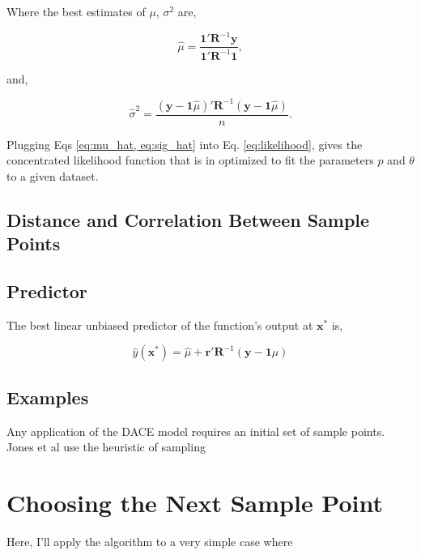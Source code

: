 \documentclass[letterpaper]{article}
\newcommand{\mb}{\mathbf}
\begin{document}
Where the best estimates of $\mu$, $\sigma^2$ are,

\begin{equation} \label{eq:mu_hat}
\hat{\mu}=\frac
	{\mb{1}'\mb{R}^{-1}\mb{y}}
	{\mb{1}'\mb{R}^{-1}\mb{1}},
\end{equation}


and,

\begin{equation} \label{eq:sig_hat}
\hat{\sigma}^2=\frac
	{(\mb{y}-\mb{1}\hat{\mu})'\mb{R}^{-1}(\mb{y}-\mb{1}\hat{\mu})}
	{n}.
\end{equation}

Plugging Eqs \ref{eq:mu_hat, eq:sig_hat} into Eq. \ref{eq:likelihood}, gives the concentrated likelihood function that is in optimized to fit the parameters $p$ and $\theta$ to a given dataset.

\subsection{Distance and Correlation Between Sample Points}




\subsection{Predictor}\label{sec:blup}The best linear unbiased predictor of the function's output at $\mb{x^*}$ is,


\begin{equation} \label{eq:blup}
\hat{y}(\mb{x^*})=\hat{\mu} + \mb{r}'\mb{R}^{-1}(\mb{y}-\mb{1}\mu)
\end{equation}



\subsection{Examples}\label{sec:dace_ex}
Any application of the DACE model requires an initial set of sample points. Jones et al use the heuristic of sampling 




\section{Choosing the Next Sample Point}
Here, I'll apply the algorithm to a very simple case where



\end{document}
